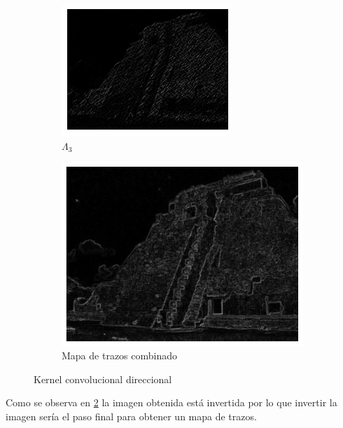 \documentclass[letterpaper, 10 pt, conference]{ieeeconf}  %
\begin{document}
\begin{figure}[H]
    \begin{subfigure}{0.45\linewidth}
\includegraphics[width=\linewidth,scale=1.2]{images/stroke_2.png}
    \caption{$\Lambda_{3}$}
\label{fig:1a}
    \end{subfigure}\hfill
    \begin{subfigure}{0.45\linewidth}
\includegraphics[width=\linewidth,scale=1.2]{images/stroke_3.png}
    \caption{Mapa de trazos combinado}
\label{kernel-d}
    \end{subfigure}
\caption{Kernel convolucional direccional}
    \label{kernel}
    \end{figure}

Como se observa en \ref{kernel-d} la imagen obtenida está invertida por lo que invertir la imagen sería el paso final para obtener un mapa de trazos.
\end{document}
